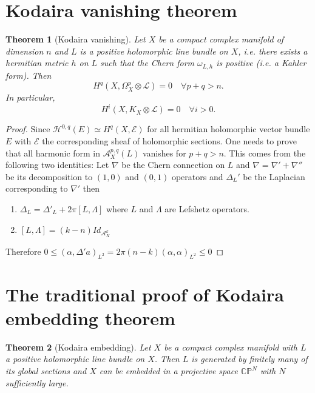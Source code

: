 \documentclass[11pt]{article}
\newtheorem{theorem}{Theorem}
\begin{document}
\section{Kodaira vanishing theorem}
\label{sec:org6163414}

\begin{theorem}[Kodaira vanishing]
\label{thm:Kodaira-vanishing}
Let \(X\) be a compact complex manifold of dimension \(n\) and \(L\) is a positive
holomorphic line bundle on \(X\), i.e. there exists a hermitian metric \(h\) on \(L\) such that the Chern form \(\omega_{L,h}\) is positive (i.e. a Kahler form). Then
\[
H^q(X,\Omega_X^p \otimes \mathcal{L}) = 0 \quad\forall p+q >n.
\]
In particular, 
\[ 
H^i(X, K_X\otimes \mathcal{L}) = 0 \quad \forall i>0.
\]
\end{theorem}

\begin{proof}
Since \(\mathcal{H}^{0,q}(E) \simeq H^q(X,\mathcal{E})\) for all hermitian holomorphic vector bundle \(E\)
with \(\mathcal{E}\) the corresponding sheaf of holomorphic sections. One needs to prove
that all harmonic form in \(\mathcal{A}_X^{p,q}(L)\) vanishes for \(p+q>n\). This
comes from the following two identities: Let \(\nabla\) be the Chern connection on \(L\) and \(\nabla = \nabla' + \nabla''\) be its decomposition to \((1,0)\) and \((0,1)\) operators and \(\Delta_L'\) be the Laplacian corresponding to \(\nabla'\) then
\begin{enumerate}
\item \(\Delta_L = \Delta'_L + 2\pi[L,\Lambda]\) where \(L\) and \(\Lambda\) are Lefshetz operators.
\item \([L,\Lambda] = (k-n)Id_{\mathcal{A}^k_X}\)
\end{enumerate}
Therefore \(0\leq(\alpha,\Delta'a)_{L^2} = 2\pi (n-k)(\alpha,\alpha)_{L^2}\leq 0\)
\end{proof}




\section{The traditional proof of Kodaira embedding theorem}
\label{sec:org67967d7}
\begin{theorem}[Kodaira embedding]
\label{thm:Kodaira-embedding}
Let \(X\) be a compact complex manifold with \(L\) a positive holomorphic line bundle
on \(X\). Then \(L\) is generated by finitely many of its global sections and \(X\)
can be embedded in a projective space \(\mathbb{C}\mathbb{P}^N\) with \(N\)
sufficiently large.
\end{theorem}
\end{document}
